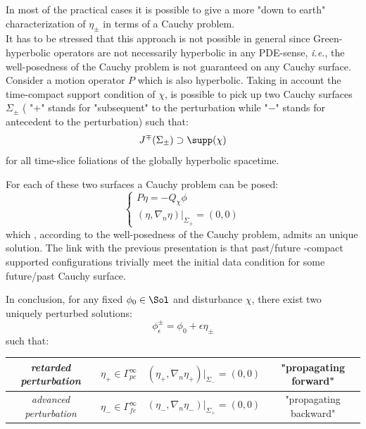 \documentclass[Main]{subfiles}
\begin{document}
		\vspace{2mm}
			In most of the practical cases it is possible to give a more "down to earth" characterization of $\eta_\pm$ in terms of a Cauchy problem.\\
			It has to be stressed that this approach is not possible in general since Green-hyperbolic operators are not necessarily hyperbolic in any PDE-sense, \textit{i.e.}, the well-posedness of the Cauchy problem is not guaranteed on any Cauchy surface. \cite[pag 1]{Bar} \cite[remark 3.18]{Bar2010}\cite[remark 2.1]{Khavkine2014}
			\\
		Consider a motion operator $P$ which is also hyperbolic.
		Taking in account the time-compact support condition of $\chi$, is possible to pick up  two Cauchy surfaces $\Sigma_\pm$ ( "$+$" stands for "subsequent" to the perturbation while "$-$" stands for antecedent to the perturbation) such that:
		\begin{displaymath}
			J^\mp (\Sigma_\pm) \supset \supp(\chi) 
		\end{displaymath}
		for all time-slice foliations of the globally hyperbolic spacetime.

		For each of these two surfaces a Cauchy problem can be posed:
		\begin{equation}\label{PerturbationCauchyProblem}
		   \begin{cases}
			   P \eta = - Q_\chi \phi \\
			   (\eta, \nabla_n \eta ) \big \vert_{\Sigma_{\pm}} = (0,0)
   			\end{cases}
   		\end{equation}
   		which , according to the well-posedness of the Cauchy problem, admits an unique solution.
   		The link with the previous presentation is that past/future -compact supported configurations trivially meet the initial data condition for some future/past Cauchy surface.
		
		\vspace{2mm}
		In conclusion, for any fixed $\phi_0 \in \Sol$ and disturbance $\chi$, there exist two uniquely perturbed solutions:
   		\begin{equation}\label{PerturbedSolution}
   			\phi^\pm_\epsilon = \phi_0 + \epsilon \eta_\pm
   		\end{equation}
   		such that:
 		\begin{center}   \begin{tabular}{|c|c|c|c|}
   		\hline
  	 		\emph{retarded perturbation} & $\eta_+ \in \Gamma^\infty_{pc}$ & $(\eta_+, \nabla_n \eta_+ ) \big \vert_{\Sigma_{-}} = (0,0)$ & "propagating forward" \\
  	 		\hline
   			\emph{advanced perturbation} &$\eta_- \in \Gamma^\infty_{fc}$ & $(\eta_-, \nabla_n \eta_- ) \big \vert_{\Sigma_{+}} = (0,0)$ & "propagating backward" \\
   			\hline
   		\end{tabular}	\end{center} 	
		
\end{document}
